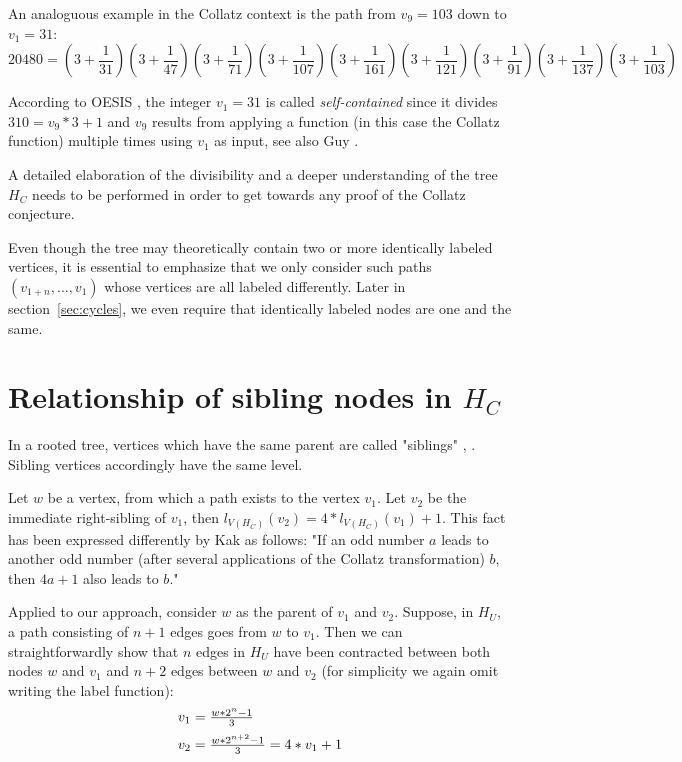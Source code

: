 An analoguous example in the Collatz context is the path from $v_9=103$ down to $v_1=31$:
\begin{equation*}
	20480=\left(3+\frac{1}{31}\right)\left(3+\frac{1}{47}\right)
	\left(3+\frac{1}{71}\right)\left(3+\frac{1}{107}\right)\left(3+\frac{1}{161}\right)\left(3+\frac{1}{121}\right)\left(3+\frac{1}{91}\right)\left(3+\frac{1}{137}\right)\left(3+\frac{1}{103}\right)
\end{equation*}

\par\medskip\noindent
According to OESIS \cite{Ref_OESIS}, the integer $v_1=31$ is called \textit{self-contained} since it divides $310=v_9*3+1$ and $v_9$ results from applying a function (in this case the Collatz function) multiple times using $v_1$ as input, see also Guy \cite[p.~332]{Ref_Guy}.

\par\bigskip
A detailed elaboration of the divisibility and a deeper understanding of the tree $H_C$ needs to be performed in order to get towards any proof of the Collatz conjecture.

\begin{remark}
	Even though the tree may theoretically contain two or more identically labeled vertices, it is essential to emphasize that we only consider such paths $(v_{1+n},\ldots,v_1)$ whose vertices are all labeled differently. Later in section~\ref{sec:cycles}, we even require that identically labeled nodes are one and the same.
\end{remark}

\section{Relationship of sibling nodes in \mbox{$H_C$}}
In a rooted tree, vertices which have the same parent are called "siblings" \cite[p.~702]{Ref_Johnsonbaugh}, \cite[p.~747]{Ref_Rosen}. Sibling vertices accordingly have the same level.

\par\medskip
Let $w$ be a vertex, from which a path exists to the vertex $v_1$. Let $v_2$ be the immediate right-sibling of $v_1$, then $l_{V\left(H_C\right)}\left(v_2\right)=4*l_{V\left(H_C\right)}\left(v_1\right)+1$. This fact has been expressed differently by Kak \cite{Ref_Kak_2014} as follows: "If an odd number $a$ leads to another odd number (after several applications of the Collatz transformation) $b$, then $4a+1$ also leads to $b$."

\par\medskip
Applied to our approach, consider $w$ as the parent of $v_1$ and $v_2$. Suppose, in $H_U$, a path consisting of $n+1$ edges goes from $w$ to $v_1$. Then we can straightforwardly show that $n$ edges in $H_U$ have been contracted between both nodes $w$ and $v_1$ and $n+2$ edges between $w$ and $v_2$ (for simplicity we again omit writing the label function):
\begin{equation*}
\begin{array}{l}
		v_1=\frac{w*2^n-1}{3}
		\\[\medskipamount]
		v_2=\frac{w*2^{n+2}-1}{3}=4*v_1+1
\end{array}
\end{equation*}

